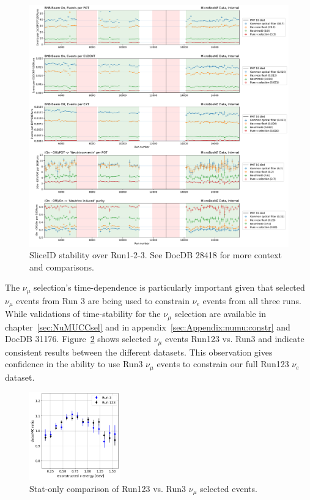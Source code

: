 \documentclass[a4paper]{article}
\newcommand{\nue}{$\nu_e$\xspace}
\newcommand{\numu}{$\nu_{\mu}$\xspace}
\begin{document}
\begin{figure}[H]
    \begin{center}
    \includegraphics[width=1.0\textwidth]{stability/events_per_exposure.pdf}
    \caption{SliceID stability over Run1-2-3. See DocDB 28418 for more context and comparisons.}
    \label{fig:stability:neutrinoID}
    \end{center}
\end{figure}

The \numu selection's time-dependence is particularly important given that selected \numu events from Run 3 are being used to constrain \nue events from all three runs. While validations of time-stability for the \numu selection are available in chapter~\ref{sec:NuMUCCsel} and in appendix~\ref{sec:Appendix:numu:constr} and DocDB 31176. Figure~\ref{fig:stability:numu} shows selected \numu events Run123 vs. Run3 and indicate consistent results between the different datasets. This observation gives confidence in the ability to use Run3 \numu events to constrain our full Run123 \nue dataset.

\begin{figure}[H]
    \begin{center}
    \includegraphics[width=0.35\textwidth]{stability/run123_vs_run3_numus.png}
    \caption{Stat-only comparison of Run123 vs. Run3 \numu selected events.}
    \label{fig:stability:numu}
    \end{center}
\end{figure}
\end{document}
